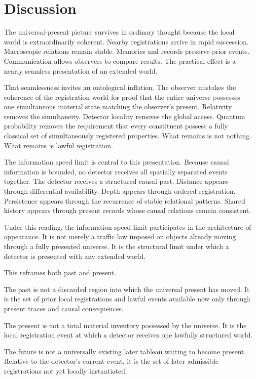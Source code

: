 \documentclass[12pt,onecolumn]{article}
\begin{document}
\section{Discussion}

The universal-present picture survives in ordinary thought because the local world is extraordinarily coherent. Nearby registrations arrive in rapid succession. Macroscopic relations remain stable. Memories and records preserve prior events. Communication allows observers to compare results. The practical effect is a nearly seamless presentation of an extended world.

That seamlessness invites an ontological inflation. The observer mistakes the coherence of the registration world for proof that the entire universe possesses one simultaneous material state matching the observer's present. Relativity removes the simultaneity. Detector locality removes the global access. Quantum probability removes the requirement that every constituent possess a fully classical set of simultaneously registered properties. What remains is not nothing. What remains is lawful registration.

The information speed limit is central to this presentation. Because causal information is bounded, no detector receives all spatially separated events together. The detector receives a structured causal past. Distance appears through differential availability. Depth appears through ordered registration. Persistence appears through the recurrence of stable relational patterns. Shared history appears through present records whose causal relations remain consistent.

Under this reading, the information speed limit participates in the architecture of appearance. It is not merely a traffic law imposed on objects already moving through a fully presented universe. It is the structural limit under which a detector is presented with any extended world.

This reframes both past and present.

The past is not a discarded region into which the universal present has moved. It is the set of prior local registrations and lawful events available now only through present traces and causal consequences.

The present is not a total material inventory possessed by the universe. It is the local registration event at which a detector receives one lawfully structured world.

The future is not a universally existing later tableau waiting to become present. Relative to the detector's current event, it is the set of later admissible registrations not yet locally instantiated.
\end{document}

